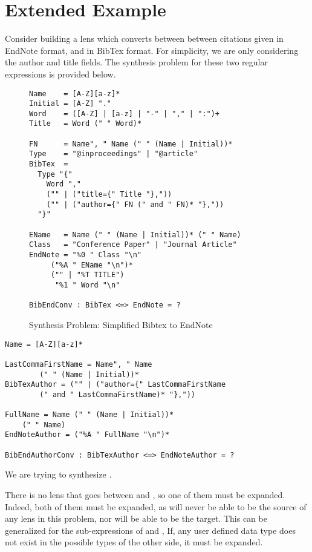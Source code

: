 \section{Extended Example}

Consider building a lens which converts between between citations given
in EndNote format, and in BibTex format.  For simplicity, we are only
considering the author and title fields.  The synthesis problem for these
two regular expressions is provided below.

\begin{figure}
\begin{lstlisting}
Name    = [A-Z][a-z]*
Initial = [A-Z] "."
Word    = ([A-Z] | [a-z] | "-" | "," | ":")+
Title   = Word (" " Word)*

FN      = Name", " Name (" " (Name | Initial))*
Type    = "@inproceedings" | "@article"
BibTex  = 
  Type "{" 
    Word ","
    ("" | ("title={" Title "},"))
    ("" | ("author={" FN (" and " FN)* "},")) 
  "}"

EName   = Name (" " (Name | Initial))* (" " Name)
Class   = "Conference Paper" | "Journal Article"
EndNote = "%0 " Class "\n"
	 ("%A " EName "\n")*
	 ("" | "%T TITLE")
	  "%1 " Word "\n"

BibEndConv : BibTex <=> EndNote = ?
\end{lstlisting}
\caption{Synthesis Problem: Simplified Bibtex to EndNote}
\end{figure}

\begin{lstlisting}
Name = [A-Z][a-z]*

LastCommaFirstName = Name", " Name
		(" " (Name | Initial))*
BibTexAuthor = ("" | ("author={" LastCommaFirstName
		(" and " LastCommaFirstName)* "},"))

FullName = Name (" " (Name | Initial))*
	(" " Name)
EndNoteAuthor = ("%A " FullName "\n")*

BibEndAuthorConv : BibTexAuthor <=> EndNoteAuthor = ?
\end{lstlisting}


We are trying to synthesize \BibEndConv{}.

There is no lens that goes between \BibTex{} and \EndNote{}, so one of them must
be expanded.
Indeed, both of them must be expanded, as \BibTex{} will never be able to be
the source of any lens in this problem, nor will \EndNote{} be able to be the
target.
This can be generalized for the sub-expressions of \BibTex{} and \EndNote{},  
If, any user defined data type does not exist in the possible types of the
other side, it must be expanded.


